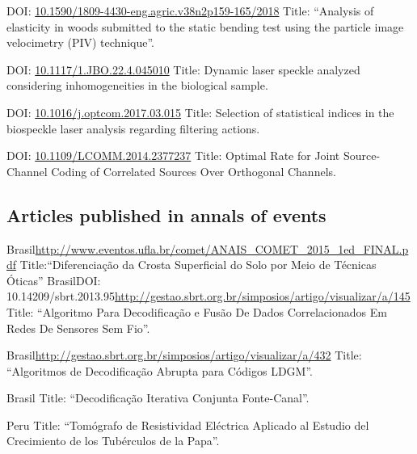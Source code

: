\documentclass[11pt,a4paper,sans]{moderncv} %
\newcommand{\doiurl}[1]{\href{https://doi.org/#1}{#1}}
\begin{document}
	      {DOI: \doiurl{10.1590/1809-4430-eng.agric.v38n2p159-165/2018}}{}{}
	      {Title: ``Analysis of elasticity in woods submitted to the static bending test using the particle image velocimetry (PIV) technique''.}

	      {DOI: \doiurl{10.1117/1.JBO.22.4.045010}}{}{}
	      {Title: Dynamic laser speckle analyzed considering inhomogeneities in the biological sample.}
	      
	      {DOI: \doiurl{10.1016/j.optcom.2017.03.015}}{}{}
	      {Title: Selection of statistical indices in the biospeckle laser analysis regarding filtering actions.}
	      
	      {DOI: \doiurl{10.1109/LCOMM.2014.2377237}}{}{}
	      {Title: Optimal  Rate for Joint Source-Channel Coding of Correlated Sources Over Orthogonal Channels.}

\subsection{Articles published in annals of events}
	      {Brasil}{}{\url{http://www.eventos.ufla.br/comet/ANAIS\_COMET\_2015\_1ed\_FINAL.pdf}}
	      {Title:``Diferenciação da Crosta Superficial do Solo por Meio de Técnicas Óticas''}
	      {Brasil}{DOI: 10.14209/sbrt.2013.95}{\url{http://gestao.sbrt.org.br/simposios/artigo/visualizar/a/145}}
	      {Title: ``Algoritmo Para Decodificação e Fusão De Dados Correlacionados Em Redes De Sensores Sem Fio''.}

	      {Brasil}{}{\url{http://gestao.sbrt.org.br/simposios/artigo/visualizar/a/432}}
	      {Title: ``Algoritmos de Decodificação Abrupta para Códigos LDGM''.}

	      {Brasil}{}{}%
	      {Title: ``Decodificação Iterativa Conjunta Fonte-Canal''.}

	      {Peru}{}{}
	      {Title: ``Tomógrafo de Resistividad Eléctrica Aplicado al Estudio del Crecimiento de los Tubérculos de la Papa''.}
\end{document}
